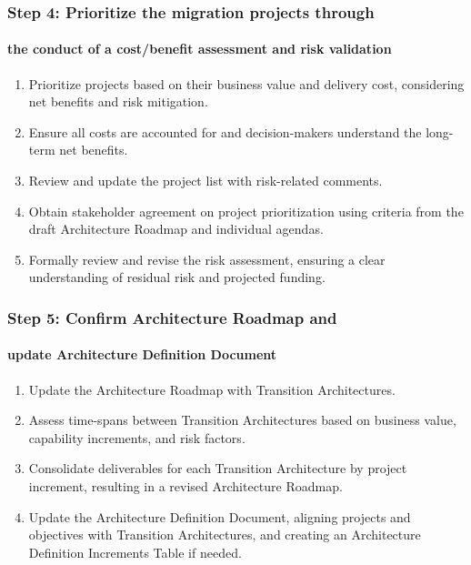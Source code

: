 \documentclass[aspectratio=169, table]{beamer}
\begin{document}
	\begin{frame}
	\frametitle{Step 4: Prioritize the migration projects through}
	\framesubtitle{the conduct of a cost/benefit assessment and risk validation}
	\vspace{20pt}
		\begin{enumerate}
			\item Prioritize projects based on their business value and delivery cost, considering net benefits and risk mitigation.
			\item Ensure all costs are accounted for and decision-makers understand the long-term net benefits.
			\item Review and update the project list with risk-related comments.
			\item Obtain stakeholder agreement on project prioritization using criteria from the draft Architecture Roadmap and individual agendas.
			\item Formally review and revise the risk assessment, ensuring a clear understanding of residual risk and projected funding.
		\end{enumerate}
\end{frame}

	\begin{frame}
	\frametitle{Step 5: Confirm Architecture Roadmap and}
	\framesubtitle{update Architecture Definition Document}
	\vspace{20pt}
		\begin{enumerate}
			\item Update the Architecture Roadmap with Transition Architectures.
			\item Assess time-spans between Transition Architectures based on business value, capability increments, and risk factors.
			\item Consolidate deliverables for each Transition Architecture by project increment, resulting in a revised Architecture Roadmap.
			\item Update the Architecture Definition Document, aligning projects and objectives with Transition Architectures, and creating an Architecture Definition Increments Table if needed.
		\end{enumerate}
\end{frame}
\end{document}
